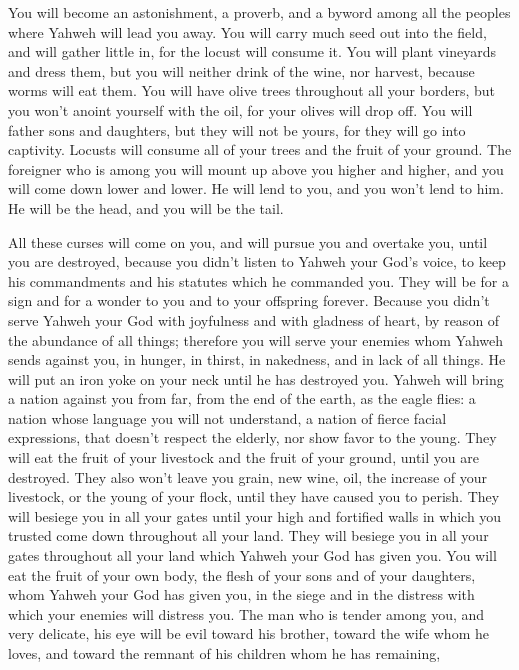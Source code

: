 {You will become an astonishment, a proverb, and a byword among all the peoples where Yahweh will lead you away.
You will carry much seed out into the field, and will gather little in, for the locust will consume it.
You will plant vineyards and dress them, but you will neither drink of the wine, nor harvest, because worms will eat them.
You will have olive trees throughout all your borders, but you won’t anoint yourself with the oil, for your olives will drop off.
You will father sons and daughters, but they will not be yours, for they will go into captivity.
Locusts will consume all of your trees and the fruit of your ground.
The foreigner who is among you will mount up above you higher and higher, and you will come down lower and lower.
He will lend to you, and you won’t lend to him. He will be the head, and you will be the tail.
\par }{\PP {}All these curses will come on you, and will pursue you and overtake you, until you are destroyed, because you didn’t listen to Yahweh your God’s voice, to keep his commandments and his statutes which he commanded you.
They will be for a sign and for a wonder to you and to your offspring forever.
Because you didn’t serve Yahweh your God with joyfulness and with gladness of heart, by reason of the abundance of all things;
therefore you will serve your enemies whom Yahweh sends against you, in hunger, in thirst, in nakedness, and in lack of all things. He will put an iron yoke on your neck until he has destroyed you.
Yahweh will bring a nation against you from far, from the end of the earth, as the eagle flies: a nation whose language you will not understand,
a nation of fierce facial expressions, that doesn’t respect the elderly, nor show favor to the young.
They will eat the fruit of your livestock and the fruit of your ground, until you are destroyed. They also won’t leave you grain, new wine, oil, the increase of your livestock, or the young of your flock, until they have caused you to perish.
They will besiege you in all your gates until your high and fortified walls in which you trusted come down throughout all your land. They will besiege you in all your gates throughout all your land which Yahweh your God has given you.
You will eat the fruit of your own body, the flesh of your sons and of your daughters, whom Yahweh your God has given you, in the siege and in the distress with which your enemies will distress you.
The man who is tender among you, and very delicate, his eye will be evil toward his brother, toward the wife whom he loves, and toward the remnant of his children whom he has remaining,
}
